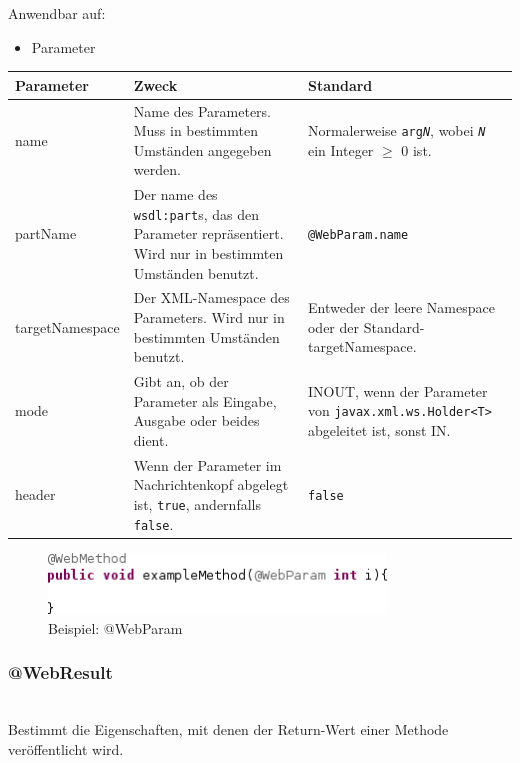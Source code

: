 \documentclass[runningheads]{llncs}
\newcommand{\anntabwidth}{\textwidth}
\begin{document}
      \noindent{}Anwendbar auf:
      \begin{itemize}
       \item Parameter\vfill
      \end{itemize}
    \begin{tabulary}{\anntabwidth}{|l|L|L|}
    \hline
    \textbf{Parameter} & \textbf{Zweck} & \textbf{Standard} \\
    \hline
      name &
      Name des Parameters. Muss in bestimmten Umständen angegeben werden. &
      Normalerweise \texttt{arg\textit{N}}, wobei \texttt{\textit{N}} ein Integer $\geq$ 0 ist. \\
    \hline
      partName &
      Der name des \texttt{wsdl:part}s, das den Parameter repräsentiert. Wird nur in bestimmten
      Umständen benutzt. &
      \texttt{@WebParam.name} \\
    \hline
      targetNamespace &
      Der XML-Namespace des Parameters. Wird nur in bestimmten Umständen benutzt. &
      Entweder der leere Namespace oder der Standard-targetNamespace. \\
    \hline
      mode &
      Gibt an, ob der Parameter als Eingabe, Ausgabe oder beides dient. &
      INOUT, wenn der Parameter von \texttt{javax.xml.ws.Holder<T>} abgeleitet ist, sonst IN. \\
    \hline
      header &
      Wenn der Parameter im Nachrichtenkopf abgelegt ist, \texttt{true}, andernfalls
      \texttt{false}. &
      \texttt{false} \\
    \hline
    \end{tabulary} \vfill
    \begin{figure}[ht!]
      \centering
      \includegraphics[width=0.8\textwidth]{../images/AtWebParam.png}
      \caption{Beispiel: @WebParam}
      \label{fig:wp}
    \end{figure} \vfill

    \subsubsection{@WebResult}\ \\
      Bestimmt die Eigenschaften, mit denen der Return-Wert einer Methode veröffentlicht wird.
\end{document}
